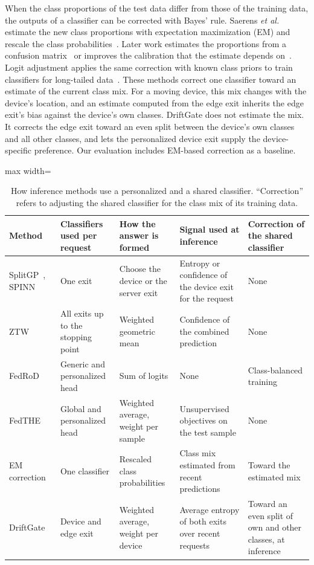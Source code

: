 When the class proportions of the test data differ from those of the training data, the outputs of a classifier can be corrected with Bayes' rule. Saerens \emph{et al.} estimate the new class proportions with expectation maximization (EM) and rescale the class probabilities~\cite{saerens2002adjusting}. Later work estimates the proportions from a confusion matrix~\cite{lipton2018bbse} or improves the calibration that the estimate depends on~\cite{alexandari2020mlls}. Logit adjustment applies the same correction with known class priors to train classifiers for long-tailed data~\cite{menon2021logit}. These methods correct one classifier toward an estimate of the current class mix. For a moving device, this mix changes with the device's location, and an estimate computed from the edge exit inherits the edge exit's bias against the device's own classes. DriftGate does not estimate the mix. It corrects the edge exit toward an even split between the device's own classes and all other classes, and lets the personalized device exit supply the device-specific preference. Our evaluation includes EM-based correction as a baseline.

\begin{table}[t]
\centering
\caption{How inference methods use a personalized and a shared classifier. ``Correction'' refers to adjusting the shared classifier for the class mix of its training data.}
\label{tab:related}
\begin{adjustbox}{max width=\textwidth}
\begin{tabular}{l>{\raggedright\arraybackslash}p{3.0cm}>{\raggedright\arraybackslash}p{3.6cm}>{\raggedright\arraybackslash}p{4.0cm}>{\raggedright\arraybackslash}p{3.4cm}}
\toprule
Method & Classifiers used per request & How the answer is formed & Signal used at inference & Correction of the shared classifier \\
\midrule
SplitGP~\cite{han2023splitgp}, SPINN~\cite{laskaridis2020spinn} & One exit & Choose the device or the server exit & Entropy or confidence of the device exit for the request & None \\
ZTW~\cite{wolczyk2021ztw} & All exits up to the stopping point & Weighted geometric mean & Confidence of the combined prediction & None \\
FedRoD~\cite{chen2022fedrod} & Generic and personalized head & Sum of logits & None & Class-balanced training \\
FedTHE~\cite{jiang2023fedthe} & Global and personalized head & Weighted average, weight per sample & Unsupervised objectives on the test sample & None \\
EM correction~\cite{saerens2002adjusting} & One classifier & Rescaled class probabilities & Class mix estimated from recent predictions & Toward the estimated mix \\
DriftGate & Device and edge exit & Weighted average, weight per device & Average entropy of both exits over recent requests & Toward an even split of own and other classes, at inference \\
\bottomrule
\end{tabular}
\end{adjustbox}
\end{table}

